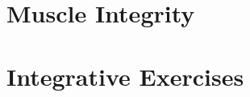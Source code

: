 \part{Muscle Integrity}



\part{Integrative Exercises}


% 

\backmatter


\printbibliography[heading=bibintoc]
\printindex




